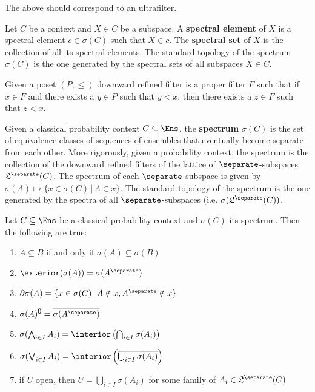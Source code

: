 \begin{remark}
	The above should correspond to an \href{https://en.wikipedia.org/wiki/Ultrafilter}{ultrafilter}.
\end{remark}

\begin{defn}
	Let $C$ be a context and $X \in C$ be a subspace. A \textbf{spectral element} of $X$ is a spectral element $c \in \sigma(C)$ such that $X \in c$. The \textbf{spectral set} of $X$ is the collection of all its spectral elements. The standard topology of the spectrum $\sigma(C)$ is the one generated by the spectral sets of all subspaces $X \in C$.
\end{defn}

	\begin{defn}
		Given a poset $(P, \leq)$ downward refined filter is a proper filter $F$ such that if $x \in F$ and there exists a $y \in P$ such that $y < x$, then there exists a $z \in F$ such that $z < x$.
	\end{defn}
	
	\begin{defn}
		Given a classical probability context $C \subseteq \Ens$, the \textbf{spectrum} $\sigma(C)$ is the set of equivalence classes of sequences of ensembles that eventually become separate from each other. More rigorously, given a probability context, the spectrum is the collection of the downward refined filters of the lattice of $\separate$-subspaces $\mathfrak{L}^\separate(C)$. The spectrum of each $\separate$-subspace is given by $\sigma(A) \mapsto \{ x \in \sigma(C) \, | \, A \in x \}$. The standard topology of the spectrum is the one generated by the spectra of all $\separate$-subspaces (i.e. $\sigma(\mathfrak{L}^\separate(C))$.
	\end{defn}
	
	\begin{prop}
		Let $C \subseteq \Ens$ be a classical probability context and $\sigma(C)$ its spectrum. Then the following are true:
		\begin{enumerate}
			\item $A \subseteq B$ if and only if $\sigma(A) \subseteq \sigma(B)$
			\item $\exterior(\sigma(A)) = \sigma(A^{\separate})$
			\item $\partial \sigma(A) = \{ x \in \sigma(C) \, | \, A \notin x, A^{\separate} \notin x \}$
			\item $\sigma(A)^{\complement} = \overline{\sigma(A^{\separate})}$
			\item $\sigma(\bigwedge_{i \in I} A_i) = \interior\left(\bigcap_{i \in I} \sigma(A_i)\right)$
			\item $\sigma(\bigvee_{i \in I} A_i) = \interior\left(\overline{\bigcup_{i \in I} \sigma(A_i)}\right)$
			\item if $U$ open, then $U = \bigcup_{i \in I} \sigma(A_i)$ for some family of $A_i \in \mathfrak{L}^\separate(C)$
		\end{enumerate}
	\end{prop}
	
